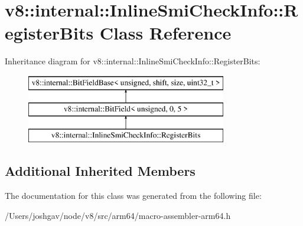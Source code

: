 \hypertarget{classv8_1_1internal_1_1_inline_smi_check_info_1_1_register_bits}{}\section{v8\+:\+:internal\+:\+:Inline\+Smi\+Check\+Info\+:\+:Register\+Bits Class Reference}
\label{classv8_1_1internal_1_1_inline_smi_check_info_1_1_register_bits}
Inheritance diagram for v8\+:\+:internal\+:\+:Inline\+Smi\+Check\+Info\+:\+:Register\+Bits\+:\begin{figure}[H]
\begin{center}
\leavevmode
\includegraphics[height=3.000000cm]{classv8_1_1internal_1_1_inline_smi_check_info_1_1_register_bits}
\end{center}
\end{figure}
\subsection*{Additional Inherited Members}


The documentation for this class was generated from the following file\+:\begin{DoxyCompactItemize}
\item 
/\+Users/joshgav/node/v8/src/arm64/macro-\/assembler-\/arm64.\+h\end{DoxyCompactItemize}
